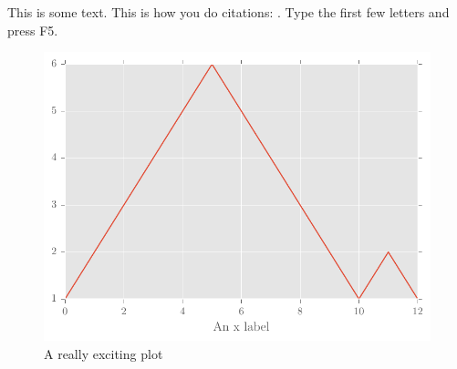 \documentclass[a4paper]{jpconf}
\begin{document}
This is some text. This is how you do citations: \cite{}. Type the first few letters and press F5.
\begin{center}
    \begin{figure}
            \includegraphics[width=\textwidth]{testMatplotlibPlot.pdf}
            \caption{A really exciting plot}
    \end{figure}
\end{center}
\end{document}
